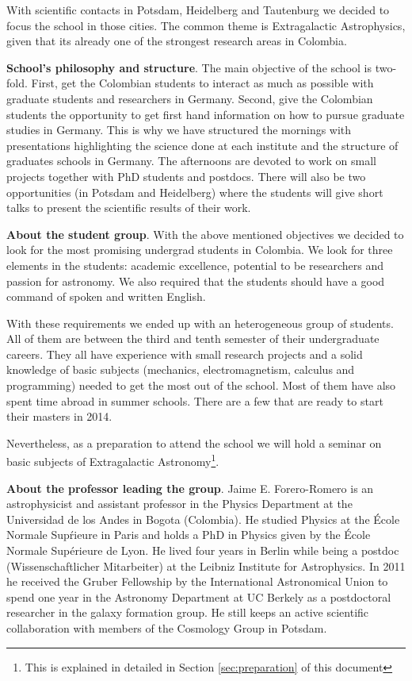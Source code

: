 \documentclass[12pt]{article}
\begin{document}
With scientific contacts in Potsdam, Heidelberg and Tautenburg we
decided to focus the school in those cities. The common theme is
Extragalactic Astrophysics, given that its already one of the
strongest research areas in Colombia. 

{\bf School's philosophy and structure}. The main objective of the school is
two-fold. First, get the Colombian students to interact as much as possible with
graduate students and researchers in Germany. Second, give the
Colombian students the opportunity to get first
hand information on how to pursue graduate studies in Germany.  This
is why we have structured the mornings with presentations highlighting
the science done at each institute and the structure of graduates
schools in Germany. The afternoons are devoted to work on small
projects together with PhD students and postdocs. There will also be
two opportunities (in Potsdam and Heidelberg) where the
students will give short talks to present the scientific results of
their work.

{\bf About the student group}. With the above mentioned objectives we
decided to look for the most promising undergrad students in
Colombia.  We look for three elements in the students: academic
excellence, potential to be researchers and passion for astronomy. We
also required that the students should have a good command of spoken
and written English.

With these requirements we ended up with an heterogeneous group of
students. All of them are between the third and tenth semester of
their undergraduate careers. They all have experience with small
research projects and a solid knowledge of basic subjects 
(mechanics, electromagnetism, calculus and programming) needed to
get the most out of the school. Most of them have also spent
time abroad in summer schools.  There are a few that are ready to
start their masters in 2014. 

Nevertheless, as a preparation to attend the school we will hold a
seminar on basic subjects of Extragalactic Astronomy\footnote{This is
  explained in detailed in Section   \ref{sec:preparation} of this
  document}. 


{\bf About the professor leading the group}. Jaime E. Forero-Romero
is an astrophysicist and assistant professor in the Physics Department
at the Universidad de los Andes in Bogota (Colombia). He studied
Physics at the \'Ecole Normale Sup\'rieure in Paris and holds a PhD in
Physics given by the \'Ecole Normale Supérieure de Lyon. He lived four 
years in Berlin while being a postdoc (Wissenschaftlicher Mitarbeiter)
at the Leibniz Institute for Astrophysics. In 2011 he received the Gruber Fellowship by the
International Astronomical Union to spend one year in the Astronomy
Department at UC Berkely as a postdoctoral researcher in the galaxy
formation group. He still keeps an active scientific collaboration
with members of the Cosmology Group in Potsdam.
\end{document}
